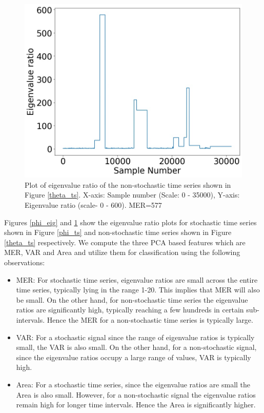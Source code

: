 \documentclass[10pt,conference]{IEEEtran}
\begin{document}
\begin{figure}[ht]
\centering
\includegraphics[width=0.8\linewidth]{sac_ascf_theta_eig.jpg}
\caption{Plot of eigenvalue ratio of the  non-stochastic time series shown in Figure \ref{theta_ts}. X-axis: Sample number (Scale: 0 - 35000), Y-axis: Eigenvalue ratio (scale- 0 - 600). MER=577 }
\label{theta_eig}
\end{figure}

Figures \ref{phi_eig} and \ref{theta_eig} show the eigenvalue ratio plots for stochastic time series shown in Figure \ref{phi_ts} and  non-stochastic time series shown in Figure \ref{theta_ts} respectively. We compute the three PCA based features which are MER, VAR and Area  and utilize them for classification using the following observations:

\begin{itemize}
\item MER: For stochastic time series, eigenvalue ratios  are small across the entire time series, typically lying in the range 1-20. This implies that MER  will also be small. On the other hand, for  non-stochastic time series the eigenvalue ratios are significantly high, typically reaching a few hundreds in certain sub-intervals. Hence the MER for a non-stochastic time series is typically large.
\item VAR: For a stochastic signal since the range of eigenvalue ratios is typically small, the VAR is also small. On the other hand, for a non-stochastic signal, since the eigenvalue ratios occupy a large range of values, VAR is typically high.
\item Area: For a stochastic time series, since the eigenvalue ratios  are small the Area is also small. However, for a non-stochastic signal the eigenvalue ratios remain high for longer time intervals. Hence the Area is significantly higher.
\end{itemize}
\end{document}
